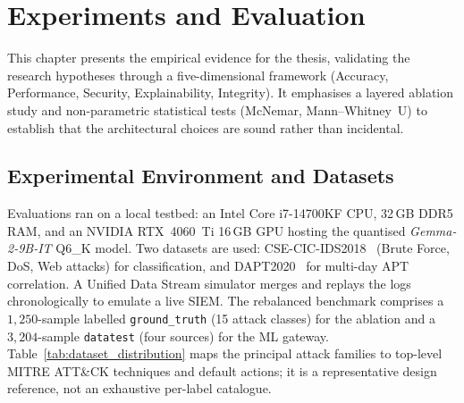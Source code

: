\chapter{Experiments and Evaluation}
\label{ch:experiments_evaluation}

This chapter presents the empirical evidence for the thesis, validating the research hypotheses through a five-dimensional framework (Accuracy, Performance, Security, Explainability, Integrity). It emphasises a layered ablation study and non-parametric statistical tests (McNemar, Mann--Whitney~U) to establish that the architectural choices are sound rather than incidental.

\section{Experimental Environment and Datasets}
Evaluations ran on a local testbed: an Intel Core i7-14700KF CPU, 32\,GB DDR5 RAM, and an NVIDIA RTX~4060~Ti 16\,GB GPU hosting the quantised \textit{Gemma-2-9B-IT} Q6\_K model. Two datasets are used: CSE-CIC-IDS2018~\cite{ids2018} (Brute Force, DoS, Web attacks) for classification, and DAPT2020~\cite{dapt2020} for multi-day APT correlation. A Unified Data Stream simulator merges and replays the logs chronologically to emulate a live SIEM. The rebalanced benchmark comprises a $1{,}250$-sample labelled \texttt{ground\_truth} (15 attack classes) for the ablation and a $3{,}204$-sample \texttt{datatest} (four sources) for the ML gateway. Table~\ref{tab:dataset_distribution} maps the principal attack families to top-level MITRE ATT\&CK techniques and default actions; it is a representative design reference, not an exhaustive per-label catalogue.


